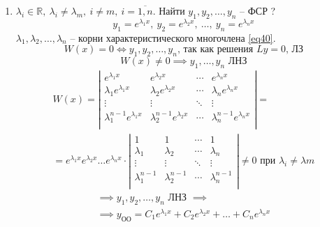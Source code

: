 \documentclass[11pt,a4paper,oneside]{report}
\theoremstyle{definition}
\theoremstyle{plain}
\theoremstyle{remark}
\begin{document}
\begin{enumerate}
    \item $\lambda_i \in \mathbb{R}, \ \lambda_i \ne \lambda_m, \ i \ne m, \ i = \overline{1,n}$. Найти $y_1,y_2,\ldots,y_n$ -- ФСР ?
          \begin{equation*}
              y_1= e^{\lambda_1 x}, \ y_2=e^{\lambda_2x},\ \ldots, \ y_n=e^{\lambda_nx}
          \end{equation*}
          $\lambda_1,\lambda_2,\ldots,\lambda_n$ -- корни характеристического многочлена \ref{eq40}.
          \begin{equation*}
              W(x) = 0 \iff y_1,y_2,\ldots,y_n\text{, так как решения }Ly = 0\text{, ЛЗ}
          \end{equation*}
          \begin{equation*}
              W(x)\ne 0 \implies y_1,\ldots,y_n\text{ ЛНЗ}
          \end{equation*}
          \begin{multline*}
              W(x) = \left|\begin{matrix}
                  e^{\lambda_1x}                & e^{\lambda_2x}                & \cdots & e^{\lambda_nx}                \\
                  \lambda_1e^{\lambda_1x}       & \lambda_2e^{\lambda_2x}       & \cdots & \lambda_ne^{\lambda_nx}       \\
                  \vdots                        & \vdots                        & \ddots & \vdots                        \\
                  \lambda_1^{n-1}e^{\lambda_1x} & \lambda_2^{n-1}e^{\lambda_2x} & \cdots & \lambda_n^{n-1}e^{\lambda_nx} \\
              \end{matrix}\right| = \\
              = e^{\lambda_1x}e^{\lambda_2x}\ldots e^{\lambda_nx}\cdot \left|\begin{matrix}
                  1               & 1               & \cdots & 1               \\
                  \lambda_1       & \lambda_2       & \cdots & \lambda_n       \\
                  \vdots          & \vdots          & \ddots & \vdots          \\
                  \lambda_1^{n-1} & \lambda_2^{n-1} & \cdots & \lambda_n^{n-1} \\
              \end{matrix}\right| \ne 0\text{ при }\lambda_i \ne \lambda m
          \end{multline*}
          \begin{multline*}
              \implies y_1,y_2,\ldots,y_n\text{ ЛНЗ }\implies \\
              \implies y_{\text{ОО}} = C_1e^{\lambda_1x} + C_2 e^{\lambda_2x} + \ldots + C_n e^{\lambda_nx}
          \end{multline*}


\end{enumerate}
\end{document}
